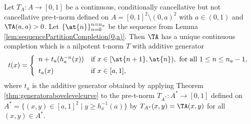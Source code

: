\begin{theorem}\label{thm:completion(0,a)} 
	Let $T_A: A \to [0,1]$ be a continuous, conditionally cancellative but not cancellative pre-t-norm defined on $A=[0,1]^2 \setminus (0,a)^2$ with $a \in (0,1)$ and $\TA(a,a)>0$. Let $\{\at{n}\}_{n=0}^{n=n_a}$ be the sequence from Lemma \ref{lem:sequencePartitionCompletion(0,a)}. Then $\TA$ has a unique continuous completion which is a nilpotent t-norm $T$ with additive generator
	\begin{equation}\label{eq:GeneratorCompletion(0,a)}
		t(x)
		=
		\left\{ \begin{array}{ll}
			n+t_a(h_a^{-n}(x)) &   \text{if }   x \in [\at{n+1},\at{n}), \text{ for all } 1 \leq n \leq n_a-1,\\[5pt]
			t_a(x) & \text{if } x \in [a,1],
		\end{array} \right.
	\end{equation}
	where $t_a$ is the additive generator obtained by applying Theorem \ref{thm:generatorabovelevelcurve} to the pre-t-norm $T_{A^*}: A^* \to [0,1]$ defined on $A^*=\{(x,y) \in [a,1]^2 \mid y \geq h_x^{-1}(a)\}$ by $T_{A^*}(x,y)=\TA(x,y)$ for all $(x,y) \in A^*$.
\end{theorem}
